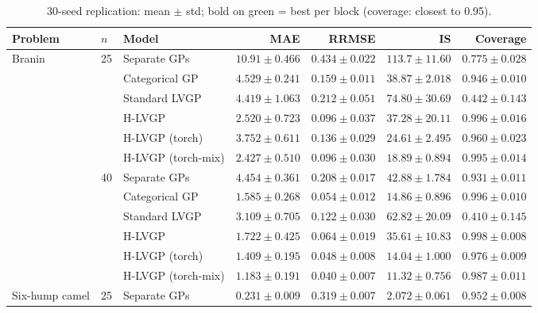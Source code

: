 \begin{table}[htbp]
\centering
\footnotesize
\renewcommand{\arraystretch}{0.85}
\setlength{\tabcolsep}{3pt}
\caption{30-seed replication: mean $\pm$ std; bold on green = best per block (coverage: closest to 0.95).}
\label{tab:seeds}
\begin{tabular}{lllrrrr}
\toprule
Problem & $n$ & Model & MAE & RRMSE & IS & Coverage \\
\midrule
\multirow{12}{*}{Branin} & \multirow{6}{*}{25} & Separate GPs & $10.91 \pm 0.466$ & $0.434 \pm 0.022$ & $113.7 \pm 11.60$ & $0.775 \pm 0.028$ \\
 &  & Categorical GP & $4.529 \pm 0.241$ & $0.159 \pm 0.011$ & $38.87 \pm 2.018$ & \colorbox{green!20}{\boldmath$0.946 \pm 0.010$} \\
 &  & Standard LVGP & $4.419 \pm 1.063$ & $0.212 \pm 0.051$ & $74.80 \pm 30.69$ & $0.442 \pm 0.143$ \\
 &  & H-LVGP & $2.520 \pm 0.723$ & \colorbox{green!20}{\boldmath$0.096 \pm 0.037$} & $37.28 \pm 20.11$ & $0.996 \pm 0.016$ \\
 &  & H-LVGP (torch) & $3.752 \pm 0.611$ & $0.136 \pm 0.029$ & $24.61 \pm 2.495$ & $0.960 \pm 0.023$ \\
 &  & H-LVGP (torch-mix) & \colorbox{green!20}{\boldmath$2.427 \pm 0.510$} & $0.096 \pm 0.030$ & \colorbox{green!20}{\boldmath$18.89 \pm 0.894$} & $0.995 \pm 0.014$ \\
\cmidrule(lr){2-7}
 & \multirow{6}{*}{40} & Separate GPs & $4.454 \pm 0.361$ & $0.208 \pm 0.017$ & $42.88 \pm 1.784$ & \colorbox{green!20}{\boldmath$0.931 \pm 0.011$} \\
 &  & Categorical GP & $1.585 \pm 0.268$ & $0.054 \pm 0.012$ & $14.86 \pm 0.896$ & $0.996 \pm 0.010$ \\
 &  & Standard LVGP & $3.109 \pm 0.705$ & $0.122 \pm 0.030$ & $62.82 \pm 20.09$ & $0.410 \pm 0.145$ \\
 &  & H-LVGP & $1.722 \pm 0.425$ & $0.064 \pm 0.019$ & $35.61 \pm 10.83$ & $0.998 \pm 0.008$ \\
 &  & H-LVGP (torch) & $1.409 \pm 0.195$ & $0.048 \pm 0.008$ & $14.04 \pm 1.000$ & $0.976 \pm 0.009$ \\
 &  & H-LVGP (torch-mix) & \colorbox{green!20}{\boldmath$1.183 \pm 0.191$} & \colorbox{green!20}{\boldmath$0.040 \pm 0.007$} & \colorbox{green!20}{\boldmath$11.32 \pm 0.756$} & $0.987 \pm 0.011$ \\
\midrule
\multirow{12}{*}{Six-hump camel} & \multirow{6}{*}{25} & Separate GPs & $0.231 \pm 0.009$ & $0.319 \pm 0.007$ & $2.072 \pm 0.061$ & \colorbox{green!20}{\boldmath$0.952 \pm 0.008$} \\

\end{tabular}
\end{table}
